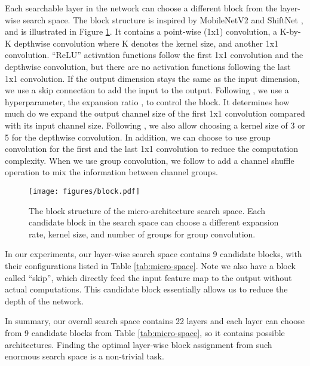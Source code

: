 \documentclass[10pt,twocolumn,letterpaper]{article}
\begin{document}
Each searchable layer in the network can choose a different block from the layer-wise search space. The block structure is inspired by MobileNetV2 \cite{sandler2018mobilenetv2} and ShiftNet \cite{wu2017shift}, and is illustrated in Figure \ref{fig:block}. It contains a point-wise (1x1) convolution, a K-by-K depthwise convolution where K denotes the kernel size, and another 1x1 convolution. ``ReLU'' activation functions follow the first 1x1 convolution and the depthwise convolution, but there are no activation functions following the last 1x1 convolution. If the output dimension stays the same as the input dimension, we use a skip connection to add the input to the output. Following \cite{sandler2018mobilenetv2, wu2017shift}, we use a hyperparameter, the expansion ratio , to control the block. It determines how much do we expand the output channel size of the first 1x1 convolution compared with its input channel size. Following \cite{tan2018mnasnet}, we also allow choosing a kernel size of 3 or 5 for the depthwise convolution. In addition, we can choose to use group convolution for the first and the last 1x1 convolution to reduce the computation complexity. When we use group convolution, we follow \cite{zhang1707shufflenet} to add a channel shuffle operation to mix the information between channel groups. 

\begin{figure}[!t]
\begin{center}
\centering \texttt{[image: figures/block.pdf]}
\caption{The block structure of the micro-architecture search space. Each candidate block in the search space can choose a different expansion rate, kernel size, and number of groups for group convolution.}
\label{fig:block}
\end{center}
\vspace{-20pt}
\end{figure}

In our experiments, our layer-wise search space contains 9 candidate blocks, with their configurations listed in Table \ref{tab:micro-space}. Note we also have a block called ``skip'', which directly feed the input feature map to the output without actual computations. This candidate block essentially allows us to reduce the depth of the network. 

In summary, our overall search space contains 22 layers and each layer can choose from 9 candidate blocks from Table \ref{tab:micro-space}, so it contains  possible architectures. Finding the optimal layer-wise block assignment from such enormous search space is a non-trivial task.
\end{document}
